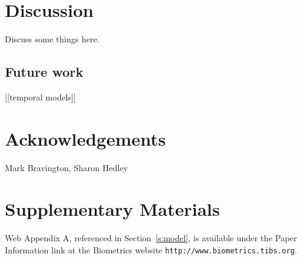 \documentclass[useAMS,referee]{biom}
\begin{document}
\section{Discussion}
\label{s:discuss}

Discuss some things here.


\subsection{Future work}

[[temporal models]]



\backmatter


\section*{Acknowledgements}

Mark Bravington, Sharon Hedley

\vspace*{-8pt}


\section*{Supplementary Materials}

Web Appendix A, referenced in Section~\ref{s:model}, is available 
under the Paper Information link at the Biometrics website
{\tt http://www.biometrics.tibs.org}.\vspace*{-8pt}

\end{document}
